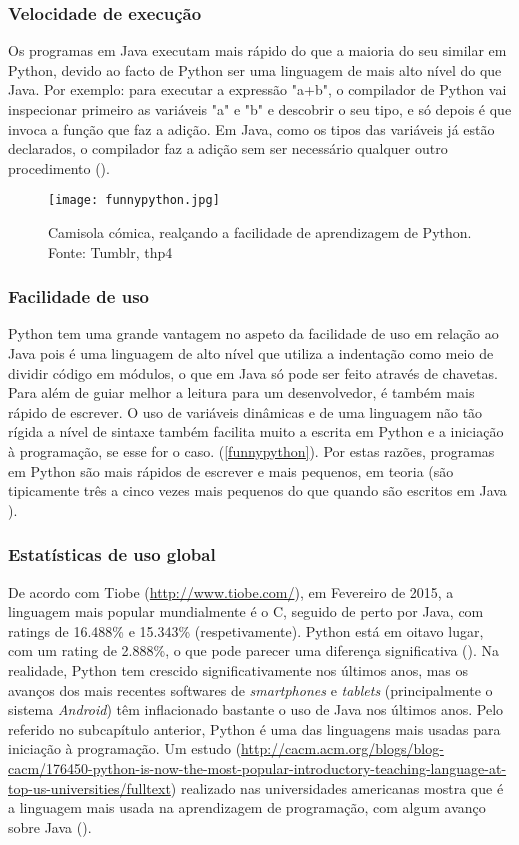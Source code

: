\documentclass[11pt,openright,twoside]{report}
\begin{document}
\subsubsection{Velocidade de execução}
Os programas em Java executam mais rápido do que a maioria do seu similar em Python, devido ao facto de Python ser uma linguagem de mais alto nível do que Java. Por exemplo: para executar a expressão "a+b", o compilador de Python vai inspecionar primeiro as variáveis "a" e "b" e descobrir o seu tipo, e só depois é que invoca a função que faz a adição. Em Java, como os tipos das variáveis já estão declarados, o compilador faz a adição sem ser necessário qualquer outro procedimento (\cite{officialpython}).

\begin{figure}
 \center
 \texttt{[image: funnypython.jpg]}
 \caption{Camisola cómica, realçando a facilidade de aprendizagem de Python. Fonte: Tumblr, thp4}
 \label{funnypython}
\end{figure}
\medskip

\subsubsection{Facilidade de uso}
Python tem uma grande vantagem no aspeto da facilidade de uso em relação ao Java pois é uma linguagem de alto nível que utiliza a indentação como meio de dividir código em módulos, o que em Java só pode ser feito através de chavetas. Para além de guiar melhor a leitura para um desenvolvedor, é também mais rápido de escrever. O uso de variáveis dinâmicas e de uma linguagem não tão rígida a nível de sintaxe também facilita muito a escrita em Python e a iniciação à programação, se esse for o caso. (\autoref{funnypython}). Por estas razões, programas em Python são mais rápidos de escrever e mais pequenos, em teoria (são tipicamente três a cinco vezes mais pequenos do que quando são escritos em Java \cite{officialpython}).
\medskip

\subsubsection{Estatísticas de uso global}
De acordo com Tiobe (\url{http://www.tiobe.com/}), em Fevereiro de 2015, a linguagem mais popular mundialmente é o C, seguido de perto por Java, com ratings de 16.488\% e 15.343\% (respetivamente). Python está em oitavo lugar, com um rating de 2.888\%, o que pode parecer uma diferença significativa (\cite{Tiobe}). Na realidade, Python tem crescido significativamente nos últimos anos, mas os avanços dos mais recentes softwares de \textit{smartphones} e \textit{tablets} (principalmente o sistema \textit{Android}) têm inflacionado bastante o uso de Java nos últimos anos.
Pelo referido no subcapítulo anterior, Python é uma das linguagens mais usadas para iniciação à programação. Um estudo (\url{http://cacm.acm.org/blogs/blog-cacm/176450-python-is-now-the-most-popular-introductory-teaching-language-at-top-us-universities/fulltext}) realizado nas universidades americanas mostra que é a linguagem mais usada na aprendizagem de programação, com algum avanço sobre Java (\cite{Pythonlearning}).
\end{document}
